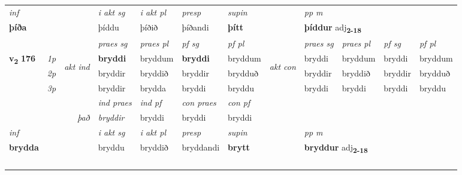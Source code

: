 \begin{longtable}[l]{X>{\footnotesize\itshape}llXXXXlXXXX}
\cmidrule{4-7}
   {\textit{inf}} & &  & \textit{i akt sg} & \textit{i akt pl}   & \textit{presp} & \textit{supin}  && \textit{pp m} \\*
  {\textbf{þíða}} & && þíddu  & þíðið   & þíðandi &  \textbf{þítt}  && \multicolumn{2}{l}{\textbf{þíddur} adj\textbf{\textsubscript{2-18}}} \\*

\midrule

 & &   & \textit{praes sg}  & \textit{praes pl}    & \textit{ pf sg} & \textit{pf pl} & & \textit{praes sg}  & \textit{praes pl}    & \textit{pf sg} & \textit{pf pl }  \\ \cmidrule{4-7} \cmidrule{9-12}
 \multirow{2}{*}{{{\textbf{v{\textsubscript{2}}} \Large{\textbf{176}}}}}  & 1p & \multirow{3}{*}{\begin{turn}{90}\textit{akt ind}\end{turn}} & \textbf{bryddi} & bryddum & \textbf{bryddi} & bryddum & \multirow{3}{*}{\begin{turn}{90}\textit{akt con}\end{turn}} &bryddi & bryddum & bryddi & bryddum\\*
 & 2p &  &  bryddir  & bryddið & bryddir & brydduð & & bryddir & bryddið & bryddir & brydduð \\*
 & 3p &  & bryddir & brydda & bryddi & bryddu & & bryddi & bryddi& bryddi & bryddu \\*
\cmidrule{4-7} \cmidrule{9-12}

   && &  \textit{ind praes} & \textit{ind pf} & \textit{con praes} & \textit{con pf} \\*
\multicolumn{3}{r}{\textit{það}} & bryddir & bryddi & bryddi & bryddi \\*

\cmidrule{4-7}
   {\textit{inf}} & &  & \textit{i akt sg} & \textit{i akt pl}   & \textit{presp} & \textit{supin}  && \textit{pp m} \\*
  {\textbf{brydda}} & && bryddu  & bryddið   & bryddandi &  \textbf{brytt}  && \multicolumn{2}{l}{\textbf{bryddur} adj\textbf{\textsubscript{2-18}}} \\*

\midrule
  & \\*
    & \\*
   & \\*
  & \\
   \midrule


\end{longtable}

